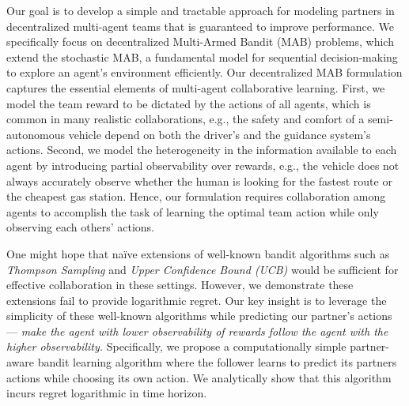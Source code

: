 \documentclass[letterpaper]{article} %
\theoremstyle{definition}
\begin{document}
Our goal is to develop a simple and tractable approach for modeling partners in decentralized multi-agent teams that is guaranteed to improve performance.
We specifically focus on decentralized Multi-Armed Bandit (MAB) problems, which extend the stochastic MAB, a fundamental model for sequential decision-making to explore an agent's environment efficiently. 
Our decentralized MAB formulation captures the essential elements of multi-agent collaborative learning.
First, we model the team reward to be dictated by the actions of all agents, which is common in many realistic collaborations, e.g., the safety and comfort of a semi-autonomous vehicle depend on both the driver's and the guidance system's actions.
Second, we model the heterogeneity in the information available to each agent by introducing partial observability over rewards, e.g., the vehicle does not always accurately observe whether the human is looking for the fastest route or the cheapest gas station.
Hence, our formulation requires collaboration among agents to accomplish the task of learning the optimal team action while only observing each others' actions. 

One might hope that na\"ive extensions of well-known bandit algorithms such as \emph{Thompson Sampling} and \emph{Upper Confidence Bound (UCB)} would be sufficient for effective collaboration in these settings. However, we demonstrate these extensions fail to provide logarithmic regret. 
Our key insight is to leverage the simplicity of these well-known algorithms while predicting our partner's actions --- \emph{make the agent with lower observability of rewards follow the agent with the higher observability.} Specifically, we propose a computationally simple partner-aware bandit learning algorithm where the follower learns to predict its partners actions while choosing its own action.
We analytically show that this algorithm incurs regret logarithmic in time horizon.  
\end{document}
